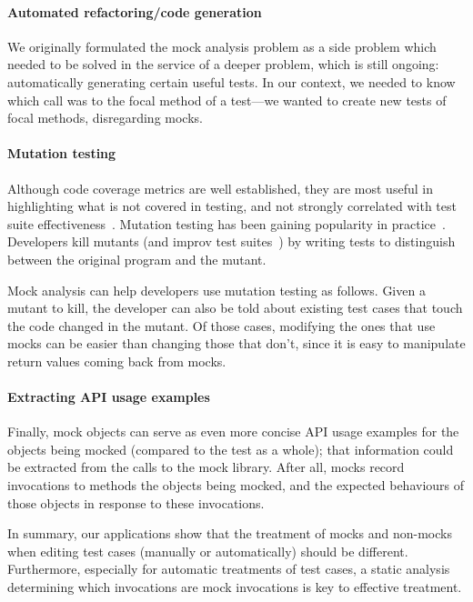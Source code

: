 \paragraph{Automated refactoring/code generation}
We originally formulated the mock analysis problem as a side problem which needed
to be solved in the service of a deeper problem, which is still
ongoing: automatically generating certain useful tests. In our context,
we needed to know which call was to the focal method of a test---we
wanted to create new tests of focal methods,
disregarding mocks.

\paragraph{Mutation testing}
Although code coverage metrics are well established, they are most useful in highlighting what is not covered in testing, and not strongly correlated with test suite effectiveness~\cite{inozemtseva14:_cover_not_stron_correl_test_suite_effec}. Mutation testing has been gaining popularity in practice~\cite{petrovic55:_pract_mutat_testin_scale,beller2021use}.
Developers kill mutants (and improv test suites~\cite{Petrovic:mutation_testing}) by writing tests to distinguish between the original program and the mutant. 

Mock analysis can help developers use mutation testing as follows. Given a mutant to kill, the developer can also be told about existing test cases that touch the code changed in the mutant. Of those cases, modifying the ones that use mocks can be easier than changing those that don't, since it is easy to manipulate return values coming back from mocks.

\paragraph{Extracting API usage examples}
Finally, mock objects can serve as even more concise API usage
examples for the objects being mocked (compared to the test as a whole);
that information could be extracted from the calls to
the mock library. After all, mocks record invocations to methods the objects
being mocked, and the expected behaviours of those objects in response to
these invocations.

In summary, our applications show that the treatment of mocks and non-mocks
when editing test cases (manually or automatically) should be different.
Furthermore, especially for automatic treatments of test cases, a static
analysis determining which invocations are mock invocations is key to effective
treatment.

